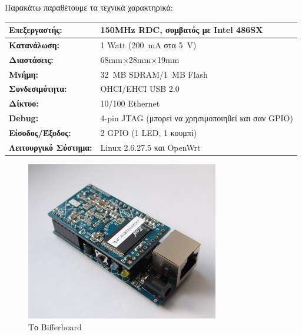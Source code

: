 \documentclass[12pt, a4paper, oneside]{report}
\begin{document}
Παρακάτω παραθέτουμε τα τεχνικά χαρακτηρικά:
\begin{table}[!hb]
\centering
{\renewcommand{\arraystretch}{1.5}
\renewcommand{\tabcolsep}{0.2cm}
\footnotesize
\begin{tabular}{L{0.3\textwidth} L{0.65\textwidth}}
\hline
\textbf{Επεξεργαστής:} & 150MHz RDC, συμβατός με Intel 486SX\\ \hline
\textbf{Κατανάλωση:} & 1 Watt (200~mA στα 5~V)\\ \hline
\textbf{Διαστάσεις:} & 68mm$\times$28mm$\times$19mm\\ \hline
\textbf{Μνήμη:} & 32~MB SDRAM\slash 1~MB Flash\\ \hline
\textbf{Συνδεσιμότητα:} & OHCI\slash EHCI USB 2.0\\ \hline
\textbf{Δίκτυο:} & 10\slash 100 Ethernet\\ \hline
\textbf{Debug:} & 4-pin JTAG (μπορεί να χρησιμοποιηθεί και σαν GPIO)\\ \hline
\textbf{Είσοδος\slash Έξοδος:} & 2 GPIO (1 LED, 1 κουμπί)\\ \hline
\textbf{Λειτουργικό Σύστημα:} & Linux 2.6.27.5 και OpenWrt\\ \hline
\end{tabular}
}
\end{table}

\begin{figure}[!hbt]
\centering
\includegraphics[width=0.75\textwidth]{img_bifferboard2}
\caption[Το Bif\mbox{}ferboard]{Το Bif\mbox{}ferboard\cite{bifferboard}}
\end{figure}
\end{document}
